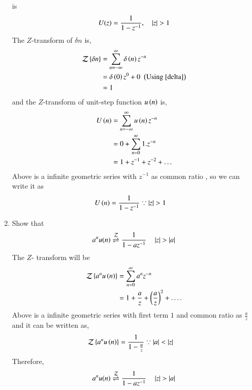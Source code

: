 \documentclass[journal,12pt,twocolumn]{IEEEtran}
\renewcommand\thesection{\arabic{section}}
\begin{document}
\begin{enumerate}[label=\thesection.\arabic*]
      is
      \begin{equation}
      U(z) = \frac{1}{1-z^{-1}}, \quad \left\vert z\right\vert > 1
      \end{equation}
      \solution 
      The $Z$-transform of $\delta{n}$ is,
      \begin{align}
          \mathcal{Z}\left\{\delta{n}\right\} &= \sum_{n=-\infty}^{\infty}\delta\left(n\right)z^{-n}\\
                                       &= \delta\left(0\right)z^{0} + 0\,\, \left(\text{Using \eqref{delta}}\right)\\
                                       &= 1
      \end{align}
       and the $Z$-transform of unit-step function $u\left(n\right)$ is,
      \begin{align}
          U\left(n\right) &= \sum_{n=-\infty}^{\infty}u\left(n\right)z^{-n}\\
                    &= 0 + \sum_{n = 0}^{\infty}1.z^{-n}\\
                    &= 1 + z^{-1} + z^{-2} + .\,.\,.
      \end{align}
       Above is a infinite geometric series with $z^{-1}$ as common ratio , so we can write it as 
      \begin{align}
          U\left(n\right) &= \frac{1}{1-z^{-1}} \because \left\vert z\right\vert > 1
      \end{align} 
    \item Show that 
      \begin{equation}
        \label{eq:anun}
        a^nu(n) \overset{\mathcal{Z}}{ \rightleftharpoons} \frac{1}{1-az^{-1}} \quad \left\vert z\right\vert > \left\vert a\right\vert
      \end{equation}
    \solution
     The $Z$- transform will be 
      \begin{align}
              \mathcal{Z}\left\{a^nu\left(n\right)\right\} &= \sum_{n = 0}^{\infty}a^{n}z^{-n}\\
                                              &= 1 + \frac{a}{z} + \left(\frac{a}{z}\right)^2 + .\,.\,.\,.
      \end{align}
     Above is a infinite geometric series with first term $1$ and common ratio as $\frac{a}{z}$ and it can 
       be written as,
      \begin{align}
              \mathcal{Z}\left\{a^nu\left(n\right)\right\} &= \frac{1}{1 - \frac{a}{z}} \because \left\vert a\right\vert < \left\vert z\right\vert 
      \end{align}
     Therefore,
      \begin{equation}
          a^nu(n) \overset{\mathcal{Z}}{ \rightleftharpoons} \frac{1}{1-az^{-1}} \quad \left\vert z\right\vert > \left\vert a\right\vert
      \end{equation}

\end{enumerate}
\end{document}
